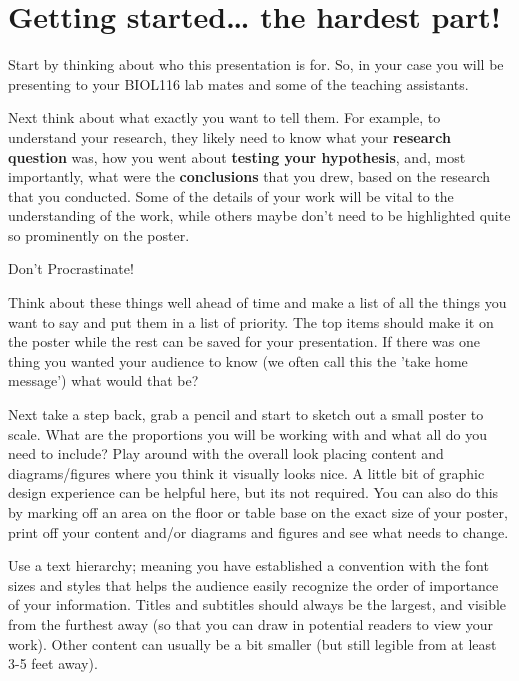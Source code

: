\documentclass[
]{book}
\begin{document}
\hypertarget{getting-started-the-hardest-part}{%
\section*{Getting started\ldots{} the hardest part!}\label{getting-started-the-hardest-part}}

Start by thinking about who this presentation is for. So, in your case you will be presenting to your BIOL116 lab mates and some of the teaching assistants.

Next think about what exactly you want to tell them. For example, to understand your research, they likely need to know what your \textbf{research question} was, how you went about \textbf{testing your hypothesis}, and, most importantly, what were the \textbf{conclusions} that you drew, based on the research that you conducted. Some of the details of your work will be vital to the understanding of the work, while others maybe don't need to be highlighted quite so prominently on the poster.

Don't Procrastinate!

Think about these things well ahead of time and make a list of all the things you want to say and put them in a list of priority. The top items should make it on the poster while the rest can be saved for your presentation. If there was one thing you wanted your audience to know (we often call this the 'take home message') what would that be?

Next take a step back, grab a pencil and start to sketch out a small poster to scale. What are the proportions you will be working with and what all do you need to include? Play around with the overall look placing content and diagrams/figures where you think it visually looks nice. A little bit of graphic design experience can be helpful here, but its not required. You can also do this by marking off an area on the floor or table base on the exact size of your poster, print off your content and/or diagrams and figures and see what needs to change.

Use a text hierarchy; meaning you have established a convention with the font sizes and styles that helps the audience easily recognize the order of importance of your information. Titles and subtitles should always be the largest, and visible from the furthest away (so that you can draw in potential readers to view your work). Other content can usually be a bit smaller (but still legible from at least 3-5 feet away).
\end{document}
